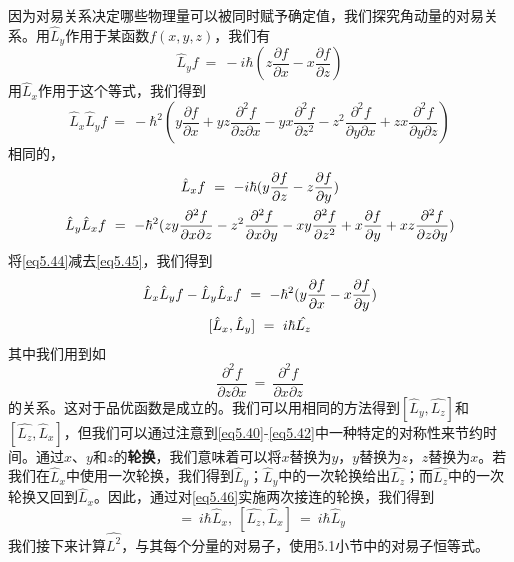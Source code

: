 \documentclass[12pt,a4paper,openany]{ctexbook}
\begin{document}
\begin{flushleft}
因为对易关系决定哪些物理量可以被同时赋予确定值，我们探究角动量的对易关系。用$\hat{L}_y$作用于某函数$f(x,y,z)$，我们有
\begin{equation*}
    \hat{L}_yf\ =\ -i\hbar(z\frac{\partial f}{\partial x}-x\frac{\partial f}{\partial z})
\end{equation*}
用$\hat{L}_x$作用于这个等式，我们得到
\begin{equation}
    \hat{L}_x\hat{L}_yf\ =\ -\hbar^2(y\frac{\partial f}{\partial x}+yz\frac{\partial^2f}{\partial z\partial x}-yx\frac{\partial^2f}{\partial z^2}-z^2\frac{\partial^2f}{\partial y\partial x}+zx\frac{\partial^2f}{\partial y\partial z}) \label{eq5.44}
\end{equation}
相同的，
\begin{gather}
    \hat{L}_xf\ =\ -i\hbar(y\frac{\partial f}{\partial z}-z\frac{\partial f}{\partial y}) \notag \\
    \hat{L}_y\hat{L}_xf\ =\ -\hbar^2(zy\frac{\partial^2 f}{\partial x\partial z}-z^2\frac{\partial^2f}{\partial x\partial y}-xy\frac{\partial^2f}{\partial z^2}+x\frac{\partial f}{\partial y}+xz\frac{\partial^2f}{\partial z\partial y}) \label{eq5.45}
\end{gather}
将\eqref{eq5.44}减去\eqref{eq5.45}，我们得到
\begin{gather}
    \hat{L}_x\hat{L}_yf-\hat{L}_y\hat{L}_xf\ =\ -\hbar^2(y\frac{\partial f}{\partial x}-x\frac{\partial f}{\partial y}) \notag \\
    [\hat{L}_x,\hat{L}_y]\ =\ i\hbar\hat{L_z} \label{eq5.46}
\end{gather}
其中我们用到如
\begin{equation}
    \boxed{\frac{\partial^2f}{\partial z\partial x}\ =\ \frac{\partial^2f}{\partial x\partial z}} \label{eq5.47}
\end{equation}
的关系。这对于品优函数是成立的。我们可以用相同的方法得到$[\hat{L}_y,\hat{L_z}]$和$[\hat{L_z},\hat{L}_x]$，但我们可以通过注意到\eqref{eq5.40}-\eqref{eq5.42}中一种特定的对称性来节约时间。通过$x$、$y$和$z$的\textbf{轮换}，我们意味着可以将$x$替换为$y$，$y$替换为$z$，$z$替换为$x$。若我们在$\hat{L}_x$中使用一次轮换，我们得到$\hat{L}_y$；$\hat{L}_y$中的一次轮换给出$\hat{L_z}$；而$\hat{L_z}$中的一次轮换又回到$\hat{L}_x$。因此，通过对\eqref{eq5.46}实施两次接连的轮换，我们得到
\begin{equation}
    [\hat{L}_y,\hat{L_z}]\ =\ i\hbar\hat{L}_x,\ [\hat{L_z},\hat{L}_x]\ =\ i\hbar\hat{L}_y \label{eq5.48}
\end{equation}
我们接下来计算$\hat{L^2}$，与其每个分量的对易子，使用5.1小节中的对易子恒等式。

\end{flushleft}
\end{document}

